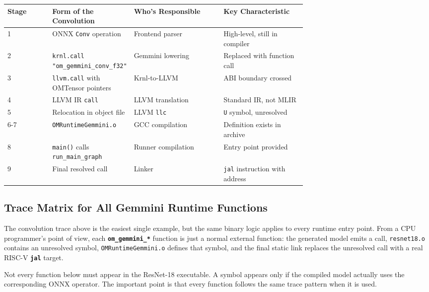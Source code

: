 \documentclass[12pt,a4paper]{article}
\newcommand{\file}[1]{\textcolor{fileteal}{\texttt{#1}}}
\newcommand{\cmd}[1]{\textcolor{argblue}{\texttt{\textbf{#1}}}}
\begin{document}
\begin{table}[H]
\centering
\small
\begin{tabularx}{\linewidth}{@{}L{0.15\linewidth}L{0.25\linewidth}L{0.30\linewidth}Y@{}}
\toprule
\textbf{Stage} & \textbf{Form of the Convolution} & \textbf{Who's Responsible} & \textbf{Key Characteristic} \\
 & ONNX \texttt{Conv} operation & Frontend parser & High-level, still in compiler \\
2 & \texttt{krnl.call "om\_gemmini\_conv\_f32"} & Gemmini lowering & Replaced with function call \\
3 & \texttt{llvm.call} with OMTensor pointers & Krnl-to-LLVM & ABI boundary crossed \\
4 & LLVM IR \texttt{call} & LLVM translation & Standard IR, not MLIR \\
5 & Relocation in object file & LLVM \texttt{llc} & \texttt{U} symbol, unresolved \\
6-7 & \texttt{OMRuntimeGemmini.o} & GCC compilation & Definition exists in archive \\
8 & \texttt{main()} calls \texttt{run\_main\_graph} & Runner compilation & Entry point provided \\
9 & Final resolved call & Linker & \texttt{jal} instruction with address \\
\bottomrule
\end{tabularx}
\end{table}

\subsection{Trace Matrix for All Gemmini Runtime Functions}

The convolution trace above is the easiest single example, but the same binary
logic applies to every runtime entry point. From a CPU programmer's point of
view, each \cmd{om\_gemmini\_*} function is just a normal external function:
the generated model emits a call, \file{resnet18.o} contains an unresolved symbol,
\file{OMRuntimeGemmini.o} defines that symbol, and the final static link replaces
the unresolved call with a real RISC-V \cmd{jal} target.

Not every function below must appear in the ResNet-18 executable. A symbol appears
only if the compiled model actually uses the corresponding ONNX operator. The
important point is that every function follows the same trace pattern when it is
used.
\end{document}
